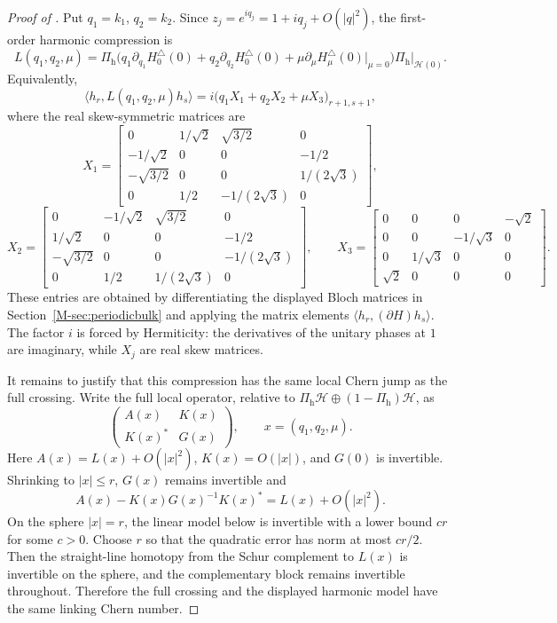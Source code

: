 \documentclass[11pt]{article}
\numberwithin{equation}{section}
\theoremstyle{definition}
\theoremstyle{remark}
\begin{document}
\begin{proof}[Proof of ]
Put \(q_1=k_1\), \(q_2=k_2\). Since \(z_j=e^{iq_j}=1+iq_j+O(|q|^2)\), the first-order harmonic
compression is
\[
L(q_1,q_2,\mu)
=\Pi_{\mathrm h}\bigl(q_1\partial_{q_1}H_0^\triangle(0)+q_2\partial_{q_2}H_0^\triangle(0)
+\mu\partial_\mu H_\mu^\triangle(0)|_{\mu=0}\bigr)\Pi_{\mathrm h}\big|_{\mathcal H(0)}.
\]
Equivalently,
\[
\langle h_r,L(q_1,q_2,\mu)h_s\rangle
=i\bigl(q_1X_1+q_2X_2+\mu X_3\bigr)_{r+1,s+1},
\]
where the real skew-symmetric matrices are
\[
X_1=
\begin{bmatrix}
0&1/\sqrt2&\sqrt{3/2}&0\\
-1/\sqrt2&0&0&-1/2\\
-\sqrt{3/2}&0&0&1/(2\sqrt3)\\
0&1/2&-1/(2\sqrt3)&0
\end{bmatrix},
\]
\[
X_2=
\begin{bmatrix}
0&-1/\sqrt2&\sqrt{3/2}&0\\
1/\sqrt2&0&0&-1/2\\
-\sqrt{3/2}&0&0&-1/(2\sqrt3)\\
0&1/2&1/(2\sqrt3)&0
\end{bmatrix},
\qquad
X_3=
\begin{bmatrix}
0&0&0&-\sqrt2\\
0&0&-1/\sqrt3&0\\
0&1/\sqrt3&0&0\\
\sqrt2&0&0&0
\end{bmatrix}.
\]
These entries are obtained by differentiating the displayed Bloch matrices in
Section~\ref{M-sec:periodicbulk} and applying the matrix elements
\(\langle h_r,(\partial H)h_s\rangle\). The factor \(i\) is forced by Hermiticity: the derivatives
of the unitary phases at \(1\) are imaginary, while \(X_j\) are real skew matrices.

It remains to justify that this compression has the same local Chern jump as the full crossing.
Write the full local operator, relative to
\(\Pi_{\mathrm h}\mathcal H\oplus(1-\Pi_{\mathrm h})\mathcal H\), as
\[
\begin{pmatrix}
A(x)&K(x)\\ K(x)^*&G(x)
\end{pmatrix},\qquad x=(q_1,q_2,\mu).
\]
Here \(A(x)=L(x)+O(|x|^2)\), \(K(x)=O(|x|)\), and \(G(0)\) is invertible. Shrinking to
\(|x|\le r\), \(G(x)\) remains invertible and
\[
A(x)-K(x)G(x)^{-1}K(x)^*=L(x)+O(|x|^2).
\]
On the sphere \(|x|=r\), the linear model below is invertible with a lower bound \(c r\) for some
\(c>0\). Choose \(r\) so that the quadratic error has norm at most \(cr/2\). Then the straight-line
homotopy from the Schur complement to \(L(x)\) is invertible on the sphere, and the complementary
block remains invertible throughout. Therefore the full crossing and the displayed harmonic model
have the same linking Chern number.


\end{proof}
\end{document}
